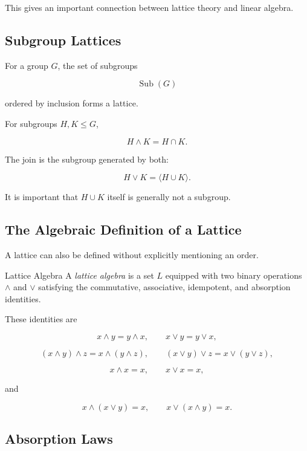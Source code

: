 This gives an important connection between lattice theory and linear
algebra.

\subsection{Subgroup Lattices}
\label{subsec:subgroup-lattices}

For a group \(G\), the set of subgroups

\[ \operatorname{Sub}(G) \]

ordered by inclusion forms a lattice.

For subgroups \(H,K\leq G\),

\[ H\wedge K=H\cap K. \]

The join is the subgroup generated by both:

\[ H\vee K=\langle H\cup K\rangle. \]

It is important that \(H\cup K\) itself is generally not a subgroup.

\subsection{The Algebraic Definition of a Lattice}
\label{subsec:algebraic-lattice-definition}

A lattice can also be defined without explicitly mentioning an order.

\begin{definitionbox}{Lattice Algebra}
A \emph{lattice algebra} is a set \(L\) equipped with two binary operations
\(\wedge\) and \(\vee\) satisfying the commutative, associative,
idempotent, and absorption identities.
\end{definitionbox}

These identities are

\[
x\wedge y=y\wedge x,\qquad
x\vee y=y\vee x,
\]

\[
(x\wedge y)\wedge z=x\wedge(y\wedge z),\qquad
(x\vee y)\vee z=x\vee(y\vee z),
\]

\[
x\wedge x=x,\qquad x\vee x=x,
\]

and

\[
x\wedge(x\vee y)=x,\qquad
x\vee(x\wedge y)=x.
\]

\subsection{Absorption Laws}
\label{subsec:absorption-laws}

